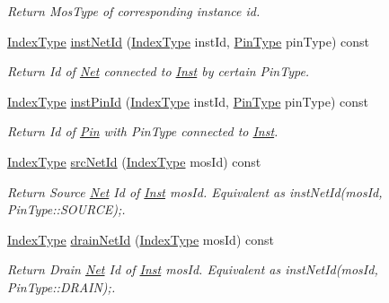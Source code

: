 \begin{DoxyCompactItemize}
\begin{DoxyCompactList}\small\item\em Return Mos\+Type of corresponding instance id. \end{DoxyCompactList}\item 
\hyperlink{type_8h_a581e8093e28e7362f2b6937296190676}{Index\+Type} \hyperlink{classNetlist_af7ac6daa5f0f66a60c71b69a1d8fd670}{inst\+Net\+Id} (\hyperlink{type_8h_a581e8093e28e7362f2b6937296190676}{Index\+Type} inst\+Id, \hyperlink{type_8h_afaab50027002ecbb6c8ac27e727d1bb4}{Pin\+Type} pin\+Type) const
\begin{DoxyCompactList}\small\item\em Return Id of \hyperlink{classNet}{Net} connected to \hyperlink{classInst}{Inst} by certain Pin\+Type. \end{DoxyCompactList}\item 
\hyperlink{type_8h_a581e8093e28e7362f2b6937296190676}{Index\+Type} \hyperlink{classNetlist_a981030068cfb1eb1ce360ee6c943513a}{inst\+Pin\+Id} (\hyperlink{type_8h_a581e8093e28e7362f2b6937296190676}{Index\+Type} inst\+Id, \hyperlink{type_8h_afaab50027002ecbb6c8ac27e727d1bb4}{Pin\+Type} pin\+Type) const
\begin{DoxyCompactList}\small\item\em Return Id of \hyperlink{classPin}{Pin} with Pin\+Type connected to \hyperlink{classInst}{Inst}. \end{DoxyCompactList}\item 
\hyperlink{type_8h_a581e8093e28e7362f2b6937296190676}{Index\+Type} \hyperlink{classNetlist_a306b7d5127774b04081c9bf3b26aebd3}{src\+Net\+Id} (\hyperlink{type_8h_a581e8093e28e7362f2b6937296190676}{Index\+Type} mos\+Id) const
\begin{DoxyCompactList}\small\item\em Return Source \hyperlink{classNet}{Net} Id of \hyperlink{classInst}{Inst} mos\+Id. Equivalent as inst\+Net\+Id(mos\+Id, Pin\+Type\+::\+S\+O\+U\+R\+C\+E);. \end{DoxyCompactList}\item 
\hyperlink{type_8h_a581e8093e28e7362f2b6937296190676}{Index\+Type} \hyperlink{classNetlist_aa7a9014b2e827cec0bf76a584c551157}{drain\+Net\+Id} (\hyperlink{type_8h_a581e8093e28e7362f2b6937296190676}{Index\+Type} mos\+Id) const
\begin{DoxyCompactList}\small\item\em Return Drain \hyperlink{classNet}{Net} Id of \hyperlink{classInst}{Inst} mos\+Id. Equivalent as inst\+Net\+Id(mos\+Id, Pin\+Type\+::\+D\+R\+A\+I\+N);. \end{DoxyCompactList}\item 

\end{DoxyCompactItemize}
